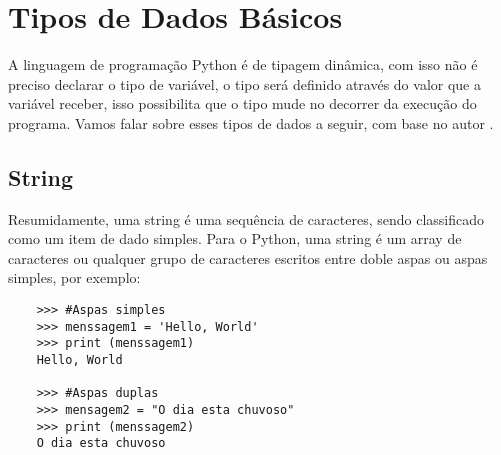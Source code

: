     \section{Tipos de Dados B\'{a}sicos}
	A linguagem de programação Python é de tipagem dinâmica, com isso não é preciso declarar o tipo de variável, o tipo será definido através do valor que a variável receber, isso possibilita que o tipo mude no decorrer da execução do programa. Vamos falar sobre esses tipos de dados a seguir, com base no autor \cite{Severance2016}.
            \subsection{String}
            Resumidamente, uma string é uma sequência de caracteres, sendo classificado como um item de dado simples. Para o Python, uma string é um array de caracteres ou qualquer grupo de caracteres escritos entre doble aspas ou aspas simples, por exemplo:
    \begin{lstlisting}
    >>> #Aspas simples
    >>> menssagem1 = 'Hello, World'
    >>> print (menssagem1)  
    Hello, World
    
    >>> #Aspas duplas
    >>> mensagem2 = "O dia esta chuvoso"
    >>> print (menssagem2)
    O dia esta chuvoso
    \end{lstlisting}
			
